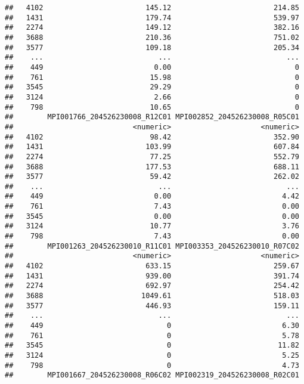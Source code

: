 \documentclass[
]{article}
\begin{document}
\begin{verbatim}
##   4102                        145.12                        214.85
##   1431                        179.74                        539.97
##   2274                        149.12                        382.16
##   3688                        210.36                        751.02
##   3577                        109.18                        205.34
##    ...                           ...                           ...
##    449                          0.00                             0
##    761                         15.98                             0
##   3545                         29.29                             0
##   3124                          2.66                             0
##    798                         10.65                             0
##        MPI001766_204526230008_R12C01 MPI002852_204526230008_R05C01
##                            <numeric>                     <numeric>
##   4102                         98.42                        352.90
##   1431                        103.99                        607.84
##   2274                         77.25                        552.79
##   3688                        177.53                        688.11
##   3577                         59.42                        262.02
##    ...                           ...                           ...
##    449                          0.00                          4.42
##    761                          7.43                          0.00
##   3545                          0.00                          0.00
##   3124                         10.77                          3.76
##    798                          7.43                          0.00
##        MPI001263_204526230010_R11C01 MPI003353_204526230010_R07C02
##                            <numeric>                     <numeric>
##   4102                        633.15                        259.67
##   1431                        939.00                        391.74
##   2274                        692.97                        254.42
##   3688                       1049.61                        518.03
##   3577                        446.93                        159.11
##    ...                           ...                           ...
##    449                             0                          6.30
##    761                             0                          5.78
##   3545                             0                         11.82
##   3124                             0                          5.25
##    798                             0                          4.73
##        MPI001667_204526230008_R06C02 MPI002319_204526230008_R02C01

\end{verbatim}
\end{document}
